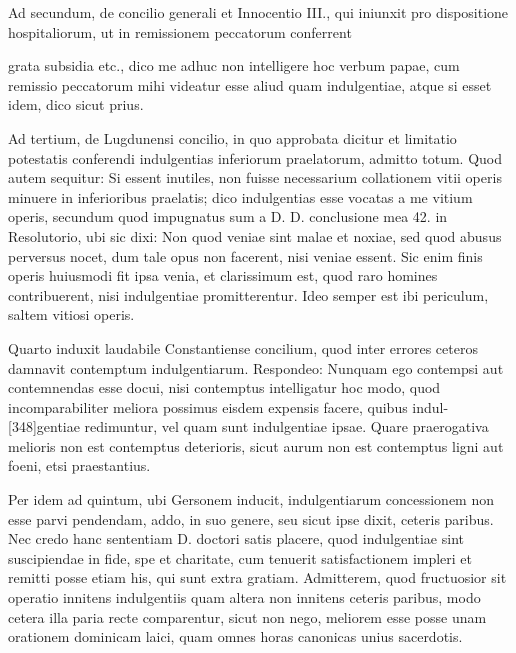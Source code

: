 Ad secundum, de concilio generali et Innocentio III., qui iniunxit pro dispositione hospitaliorum, ut in remissionem peccatorum conferrent

grata subsidia etc., dico me adhuc non intelligere hoc verbum papae, cum remissio peccatorum mihi videatur esse aliud quam indulgentiae, atque si esset idem, dico sicut prius.

Ad tertium, de Lugdunensi concilio, in quo approbata dicitur et limitatio potestatis conferendi indulgentias inferiorum praelatorum, admitto totum. Quod autem sequitur: Si essent inutiles, non fuisse necessarium collationem vitii operis minuere in inferioribus praelatis; dico indulgentias esse vocatas a me vitium operis, secundum quod impugnatus sum a D. D. conclusione mea 42. in Resolutorio, ubi sic dixi: Non quod veniae sint malae et noxiae, sed quod abusus perversus nocet, dum tale opus non facerent, nisi veniae essent. Sic enim finis operis huiusmodi fit ipsa venia, et clarissimum est, quod raro homines contribuerent, nisi indulgentiae promitterentur. Ideo semper est ibi periculum, saltem vitiosi operis.

Quarto induxit laudabile Constantiense concilium, quod inter errores ceteros damnavit contemptum indulgentiarum. Respondeo: Nunquam ego contempsi aut contemnendas esse docui, nisi contemptus intelligatur hoc modo, quod incomparabiliter meliora possimus eisdem expensis facere, quibus indul-[348]gentiae redimuntur, vel quam sunt indulgentiae ipsae. Quare praerogativa melioris non est contemptus deterioris, sicut aurum non est contemptus ligni aut foeni, etsi praestantius.

Per idem ad quintum, ubi Gersonem inducit, indulgentiarum concessionem non esse parvi pendendam, addo, in suo genere, seu sicut ipse dixit, ceteris paribus. Nec credo hanc sententiam D. doctori satis placere, quod indulgentiae sint suscipiendae in fide, spe et charitate, cum tenuerit satisfactionem impleri et remitti posse etiam his, qui sunt extra gratiam. Admitterem, quod fructuosior sit operatio innitens indulgentiis quam altera non innitens ceteris paribus, modo cetera illa paria recte comparentur, sicut non nego, meliorem esse posse unam orationem dominicam laici, quam omnes horas canonicas unius sacerdotis.

